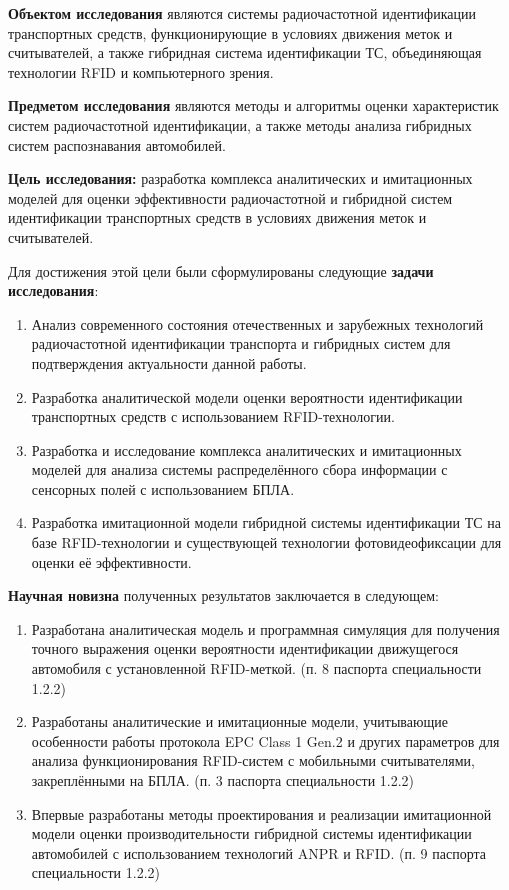 \documentclass[12pt]{article}
\theoremstyle{definition}
\begin{document}
\textbf{Объектом исследования} являются системы радиочастотной идентификации транспортных средств, функционирующие в условиях движения меток и считывателей, а также гибридная система идентификации ТС, объединяющая технологии RFID и компьютерного зрения.

\textbf{Предметом исследования} являются методы и алгоритмы оценки характеристик систем радиочастотной идентификации, а также методы анализа гибридных систем распознавания автомобилей.

\textbf{Цель исследования:}
разработка комплекса аналитических и имитационных моделей для оценки эффективности радиочастотной и гибридной систем идентификации транспортных средств в условиях движения меток и считывателей. 

Для достижения этой цели были сформулированы следующие \textbf{задачи исследования}:

\begin{enumerate}
    \item Анализ современного состояния отечественных и зарубежных технологий радиочастотной идентификации транспорта и гибридных систем для подтверждения актуальности данной работы.
    \item Разработка аналитической модели оценки вероятности идентификации транспортных средств с использованием RFID-технологии.
    \item Разработка и исследование комплекса аналитических и имитационных моделей для анализа системы распределённого сбора информации с сенсорных полей с использованием БПЛА.
    \item Разработка имитационной модели гибридной системы идентификации ТС на базе RFID-технологии и существующей технологии фотовидеофиксации для оценки её эффективности.
\end{enumerate}

\textbf{Научная новизна} полученных результатов заключается в следующем:
\begin{enumerate}
    \item Разработана аналитическая модель и программная симуляция для получения точного выражения оценки вероятности идентификации движущегося автомобиля с установленной RFID-меткой. (п. 8 паспорта специальности 1.2.2)
    \item Разработаны аналитические и имитационные модели, учитывающие особенности работы протокола EPC Class 1 Gen.2 и других параметров для анализа функционирования RFID-систем с мобильными считывателями, закреплёнными на БПЛА. (п. 3 паспорта специальности 1.2.2)
    \item Впервые разработаны методы проектирования и реализации имитационной модели оценки производительности гибридной системы идентификации автомобилей с использованием технологий ANPR и RFID. (п. 9 паспорта специальности 1.2.2)
\end{enumerate}
\end{document}

